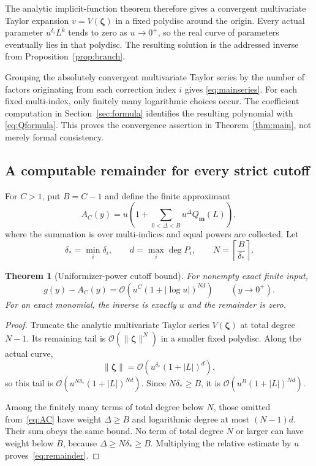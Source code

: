 \documentclass[11pt,a4paper]{article}
\numberwithin{equation}{section}
\newtheorem{theorem}{Theorem}[section]
\theoremstyle{definition}
\theoremstyle{remark}
\newcommand{\OO}{\mathcal O}
\begin{document}
The analytic implicit-function theorem therefore gives a convergent
multivariate Taylor expansion $v=V(\boldsymbol\zeta)$ in a fixed
polydisc around the origin. Every actual parameter $u^{\delta_i}L^k$
tends to zero as $u\to0^+$, so the real curve of parameters eventually
lies in that polydisc. The resulting solution is the addressed inverse
from Proposition~\ref{prop:branch}.

Grouping the absolutely convergent multivariate Taylor series by the
number of factors originating from each correction index $i$ gives
\eqref{eq:mainseries}. For each fixed multi-index, only finitely many
logarithmic choices occur. The coefficient computation in
Section~\ref{sec:formula} identifies the resulting polynomial with
\eqref{eq:Qformula}. This proves the convergence assertion in
Theorem~\ref{thm:main}, not merely formal consistency.

\subsection{A computable remainder for every strict cutoff}

For $C>1$, put $B=C-1$ and define the finite approximant
\begin{equation}\label{eq:AC}
 A_C(y)=u\left(1+\sum_{0<\Delta<B}
 u^\Delta Q_{\boldsymbol m}(L)\right),
\end{equation}
where the summation is over multi-indices and equal powers are collected.
Let
\begin{equation}\label{eq:Nandd}
 \delta_* =\min_i\delta_i,\qquad
 d=\max_i\deg P_i,\qquad N=\left\lceil\frac{B}{\delta_*}\right\rceil.
\end{equation}

\begin{theorem}[Uniformizer-power cutoff bound]\label{thm:remainder}
For nonempty exact finite input,
\begin{equation}\label{eq:remainder}
 g(y)-A_C(y)=\OO\!\left(u^C(1+|\log u|)^{Nd}\right)
 \qquad(y\to0^+).
\end{equation}
For an exact monomial, the inverse is exactly $u$ and the remainder is zero.
\end{theorem}
\begin{proof}
Truncate the analytic multivariate Taylor series
$V(\boldsymbol\zeta)$ at total degree $N-1$. Its remaining tail is
$\OO(\|\boldsymbol\zeta\|^N)$ in a smaller fixed polydisc. Along the
actual curve,
\[
 \|\boldsymbol\zeta\|
 =\OO\!\left(u^{\delta_*}(1+|L|)^d\right),
\]
so this tail is
$\OO(u^{N\delta_*}(1+|L|)^{Nd})$. Since $N\delta_*\ge B$, it is
$\OO(u^B(1+|L|)^{Nd})$.

Among the finitely many terms of total degree below $N$, those omitted
from~\eqref{eq:AC} have weight $\Delta\ge B$ and logarithmic degree at
most $(N-1)d$. Their sum obeys the same bound. No term of total degree
$N$ or larger can have weight below $B$, because
$\Delta\ge N\delta_*\ge B$. Multiplying the relative estimate by $u$
proves~\eqref{eq:remainder}.
\end{proof}
\end{document}
